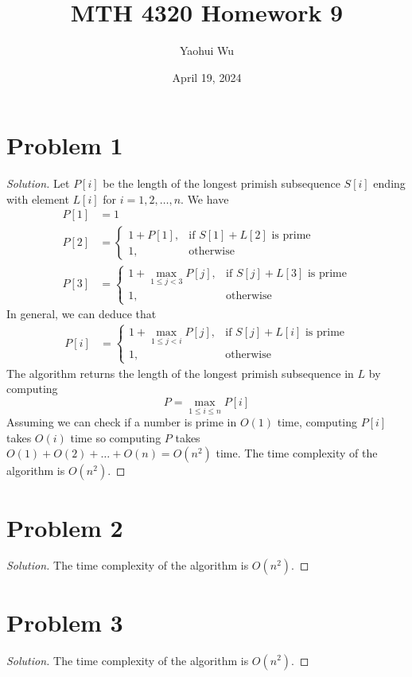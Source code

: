 \documentclass[12pt]{article}
\title{MTH 4320 Homework 9}
\author{Yaohui Wu}
\date{April 19, 2024}
\newenvironment*{solution}{\begin{proof}[Solution]}{\end{proof}}
\begin{document}
\maketitle
\section*{Problem 1}
\begin{solution}
    Let \(P[i]\) be the length of the longest primish subsequence \(S[i]\)
    ending with element \(L[i]\) for \(i=1,2,\dots,n\). We have
    \begin{align*}
        P[1] &= 1 \\
        P[2] &= \begin{cases}
            1+P[1], &\text{if \(S[1]+L[2]\) is prime} \\
            1, &\text{otherwise}
        \end{cases} \\
        P[3] &= \begin{cases}
            1+\max_{1\leq j<3}P[j], &\text{if \(S[j]+L[3]\) is prime} \\
            1, &\text{otherwise}
        \end{cases}
    \end{align*}
    In general, we can deduce that
    \begin{align*}
        P[i] &= \begin{cases}
            1+\max_{1\leq j<i}P[j], &\text{if \(S[j]+L[i]\) is prime} \\
            1, &\text{otherwise}
        \end{cases}
    \end{align*}
    The algorithm returns the length of the longest primish subsequence in
    \(L\) by computing \[P=\max_{1\leq i\leq n}P[i]\] Assuming we can check if
    a number is prime in \(O(1)\) time, computing \(P[i]\) takes \(O(i)\) time
    so computing \(P\) takes \(O(1)+O(2)+\dots+O(n)=O(n^2)\) time. The time
    complexity of the algorithm is \(O(n^2)\).
\end{solution}
\section*{Problem 2}
\begin{solution}
    The time complexity of the algorithm is \(O(n^2)\).
\end{solution}
\section*{Problem 3}
\begin{solution}
    The time complexity of the algorithm is \(O(n^2)\).
\end{solution}
\end{document}
